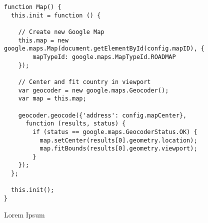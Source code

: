 \begin{verbatim}
function Map() {
  this.init = function () {

    // Create new Google Map
    this.map = new google.maps.Map(document.getElementById(config.mapID), {
        mapTypeId: google.maps.MapTypeId.ROADMAP
    });

    // Center and fit country in viewport
    var geocoder = new google.maps.Geocoder();
    var map = this.map;

    geocoder.geocode({'address': config.mapCenter},
      function (results, status) {
        if (status == google.maps.GeocoderStatus.OK) {
          map.setCenter(results[0].geometry.location);
          map.fitBounds(results[0].geometry.viewport);
        }
    });
  };

  this.init();
}
\end{verbatim}

Lorem Ipsum










